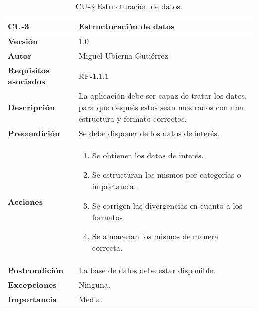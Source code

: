 \begin{table}[p]
	\centering
	\begin{tabularx}{\linewidth}{ p{} p{} }
		\toprule
		\textbf{CU-3}    & \textbf{Estructuración de datos}\\
		\toprule
		\textbf{Versión}              & 1.0    \\
		\textbf{Autor}                & Miguel Ubierna Gutiérrez \\
		\textbf{Requisitos asociados} & RF-1.1.1 \\
		\textbf{Descripción}          & La aplicación debe ser capaz de tratar los datos, para que después estos sean mostrados con una estructura y formato correctos. \\
		\textbf{Precondición}         & Se debe disponer de los datos de interés. \\
		\textbf{Acciones}             &
		\begin{enumerate}
			\def\labelenumi{\arabic{enumi}.}
			\tightlist
			\item Se obtienen los datos de interés.
			\item Se estructuran los mismos por categorías o importancia.
                \item Se corrigen las divergencias en cuanto a los formatos.
                \item Se almacenan los mismos de manera correcta.
		\end{enumerate}\\
		\textbf{Postcondición}        & La base de datos debe estar disponible. \\
		\textbf{Excepciones}          & Ninguna.  \\
		\textbf{Importancia}          & Media.  \\
		\bottomrule
	\end{tabularx}
	\caption{CU-3 Estructuración de datos.}
\end{table}

